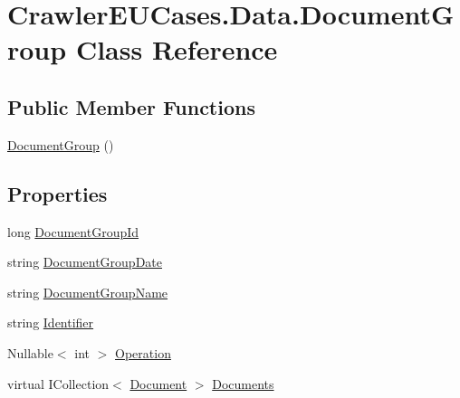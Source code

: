\hypertarget{class_crawler_e_u_cases_1_1_data_1_1_document_group}{\section{Crawler\-E\-U\-Cases.\-Data.\-Document\-Group Class Reference}
\label{class_crawler_e_u_cases_1_1_data_1_1_document_group}
}
\subsection*{Public Member Functions}
\begin{DoxyCompactItemize}
\item 
\hyperlink{class_crawler_e_u_cases_1_1_data_1_1_document_group_aa477d5038f99aae34ba40717bb44ec53}{Document\-Group} ()
\end{DoxyCompactItemize}
\subsection*{Properties}
\begin{DoxyCompactItemize}
\item 
long \hyperlink{class_crawler_e_u_cases_1_1_data_1_1_document_group_af345725343334aa77d79ecfbb875209f}{Document\-Group\-Id}
\item 
string \hyperlink{class_crawler_e_u_cases_1_1_data_1_1_document_group_a4b220023b06fd7307496c7b58c762b65}{Document\-Group\-Date}
\item 
string \hyperlink{class_crawler_e_u_cases_1_1_data_1_1_document_group_a0b1a414af3cdb8fa1a702b7b47958f08}{Document\-Group\-Name}
\item 
string \hyperlink{class_crawler_e_u_cases_1_1_data_1_1_document_group_a5d9b0d4dc44c252ca07903c2c2b7a17b}{Identifier}
\item 
Nullable$<$ int $>$ \hyperlink{class_crawler_e_u_cases_1_1_data_1_1_document_group_ac9ab34aa40a740ad2fe7c29000620261}{Operation}
\item 
virtual I\-Collection$<$ \hyperlink{class_crawler_e_u_cases_1_1_data_1_1_document}{Document} $>$ \hyperlink{class_crawler_e_u_cases_1_1_data_1_1_document_group_a02bd75a99fb88ed448675ecd5d416b0f}{Documents}
\end{DoxyCompactItemize}


